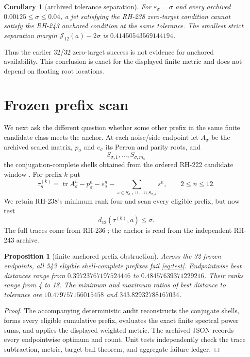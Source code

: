 \documentclass[11pt]{article}
\newtheorem{corollary}[theorem]{Corollary}
\newtheorem{proposition}[theorem]{Proposition}
\newcommand{\J}{\mathcal J}
\begin{document}
\begin{corollary}[archived tolerance separation]\label{cor:archive}
For $\varepsilon_\sigma=\sigma$ and every archived
$0.00125\le\sigma\le0.04$, a jet satisfying the RH-238 zero-target condition
cannot satisfy the RH-243 anchored condition at the same tolerance.  The
smallest strict separation margin $\J_{12}(a)-2\sigma$ is
$0.41450543569144194$.
\end{corollary}

Thus the earlier 32/32 zero-target success is not evidence for anchored
availability.  This conclusion is exact for the displayed finite metric and
does not depend on floating root locations.

\section{Frozen prefix scan}

We next ask the different question whether some other prefix in the same
finite candidate class meets the anchor.  At each noise/side endpoint let
$A_\sigma$ be the archived scaled matrix, $p_\sigma$ and $e_\sigma$ its Perron
and parity roots, and
\[
 S_{\sigma,1},\ldots,S_{\sigma,m_\sigma}
\]
the conjugation-complete shells obtained from the ordered RH-222 candidate
window \citep{WangRH222}.  For prefix $k$ put
\[
 \tau_n^{(k)}
 =\operatorname{tr}A_\sigma^n-p_\sigma^n-e_\sigma^n
  -\sum_{s\in S_{\sigma,1}\cup\cdots\cup S_{\sigma,k}}s^n,
 \qquad 2\le n\le12.
\]
We retain RH-238's minimum rank four and scan every eligible prefix, but now
test
\begin{equation}\label{eq:test}
 d_{12}(\tau^{(k)},a)\le\sigma.
\end{equation}
The full traces come from RH-236 \citep{WangRH236}; the anchor is read from
the independent RH-243 archive.

\begin{proposition}[finite anchored prefix obstruction]\label{prop:scan}
Across the 32 frozen endpoints, all 543 eligible shell-complete prefixes fail
\eqref{eq:test}.  Endpointwise best distances range from
$0.39723767197524446$ to $0.48457639371229216$.  Their ranks range from 4 to
18.  The minimum and maximum ratios of best distance to tolerance are
$10.479757156015458$ and $343.82932788167034$.
\end{proposition}

\begin{proof}
The accompanying deterministic audit reconstructs the conjugate shells,
forms every eligible cumulative prefix, evaluates the exact finite spectral
power sums, and applies the displayed weighted metric.  The archived JSON
records every endpointwise optimum and count.  Unit tests independently
check the trace subtraction, metric, target-ball theorem, and aggregate
failure ledger.
\end{proof}
\end{document}
